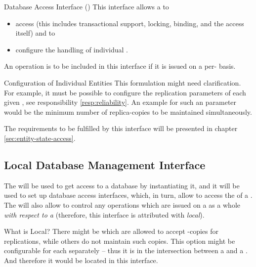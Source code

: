 \documentclass[a4paper, 12pt]{book}
\begin{document}

\newcommand{\DBAIText}{This interface allows a \dt{client} to
  \begin{itemize}
  \item access \dt{entities} (this includes transactional support,
  locking, binding, and the access itself) and to
  \item configure the handling of individual \dt{entities}.
  \end{itemize}
  An operation is to be included in this interface if it is issued on a
  per-\dt{entity} basis. 
}

\begin{definition*}{Database Access Interface (\DBAI)}
  \label{def:database-access-interface}
  \DBAIText
\end{definition*}
%
\begin{example*}{Configuration of Individual Entities}
  This formulation might need clarification. For example, it must be possible
  to configure the replication parameters of each given , see
  responsibility \vref{resp:reliability}. An example for such an parameter
  would be the minimum number of replica-copies to be maintained
  simultaneously. 
\end{example*}
%
The requirements to be fulfilled by this interface will be presented in
chapter \vref{sec:entity-state-access}. 

\subsection{Local Database Management Interface}

The  will be used to get
access to a database by instantiating it, and it will be used to set
up database access interfaces, which, in turn, allow to access the
 of a . The  will also allow to control any operations which are issued
on a  as a whole \emph{with respect to a
} (therefore, this interface is attributed
with \emph{local}).

\begin{example*}{What is Local?}
  There might be  which are allowed to accept
  -copies for replications, while others do not maintain such
  copies. This option might be configurable for each  separately
  -- thus it is in the intersection between a  and a
  . And therefore it would be located in this
  interface.
\end{example*}
\end{document}
